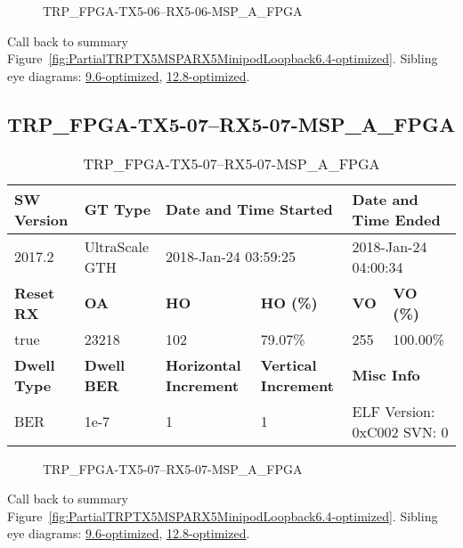 \begin{figure}[h]
\caption{TRP\_FPGA-TX5-06--RX5-06-MSP\_A\_FPGA} \label{fig:TRPFPGATX506RX506MSPAFPGA6.4-optimized}
\end{figure}

Call back to summary Figure~\ref{fig:PartialTRPTX5MSPARX5MinipodLoopback6.4-optimized}.
Sibling eye diagrams: \hyperref[sec:TRPFPGATX506RX506MSPAFPGA9.6-optimized]{9.6-optimized}, \hyperref[sec:TRPFPGATX506RX506MSPAFPGA12.8-optimized]{12.8-optimized}.

\clearpage
\newpage


\subsection{TRP\_FPGA-TX5-07--RX5-07-MSP\_A\_FPGA}\label{sec:TRPFPGATX507RX507MSPAFPGA6.4-optimized}

\begin{table}[h]
\centering
\caption{TRP\_FPGA-TX5-07--RX5-07-MSP\_A\_FPGA}
\label{tab:TRPFPGATX507RX507MSPAFPGA6.4-optimized}
\begin{tabular}{@{}|l|l|l|l|l|l|@{}}
\toprule
\textbf{SW Version}                & \textbf{GT Type}   & \multicolumn{2}{l|}{\textbf{Date and Time Started}}            & \multicolumn{2}{l|}{\textbf{Date and Time Ended}}        \\ \midrule
2017.2                       & UltraScale GTH          & \multicolumn{2}{l|}{2018-Jan-24 03:59:25}                   & \multicolumn{2}{l|}{2018-Jan-24 04:00:34}               \\ \midrule
\textbf{Reset RX}                  & \textbf{OA} & \textbf{HO}   & \textbf{HO (\%)} & \textbf{VO} & \textbf{VO (\%)} \\ \midrule
true & 23218        & 102          & 79.07\%        & 255        & 100.00\%       \\ \midrule
\textbf{Dwell Type}                & \textbf{Dwell BER} & \textbf{Horizontal Increment} & \textbf{Vertical Increment}    & \multicolumn{2}{l|}{\textbf{Misc Info}}                  \\ \midrule
BER                            & 1e-7        & 1        & 1           & \multicolumn{2}{l|}{ELF Version: 0xC002 SVN: 0}                         \\ \bottomrule
\end{tabular}
\end{table}

\begin{figure}[h]
\caption{TRP\_FPGA-TX5-07--RX5-07-MSP\_A\_FPGA} \label{fig:TRPFPGATX507RX507MSPAFPGA6.4-optimized}
\end{figure}

Call back to summary Figure~\ref{fig:PartialTRPTX5MSPARX5MinipodLoopback6.4-optimized}.
Sibling eye diagrams: \hyperref[sec:TRPFPGATX507RX507MSPAFPGA9.6-optimized]{9.6-optimized}, \hyperref[sec:TRPFPGATX507RX507MSPAFPGA12.8-optimized]{12.8-optimized}.

\clearpage
\newpage

